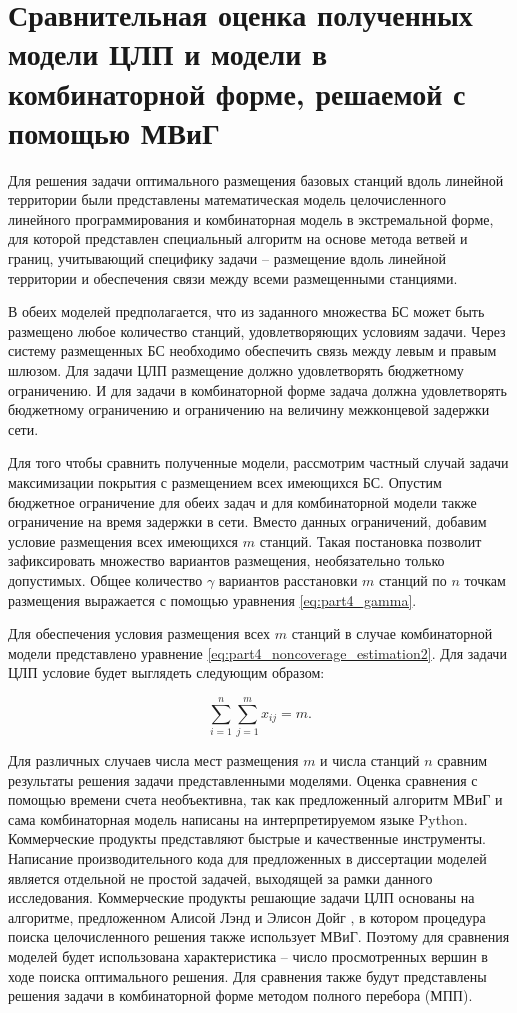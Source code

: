 \section{Сравнительная оценка полученных модели ЦЛП и модели в комбинаторной форме, решаемой с помощью МВиГ}
Для решения задачи оптимального размещения базовых станций вдоль линейной территории были представлены математическая модель целочисленного линейного программирования и комбинаторная модель в экстремальной форме, для которой представлен специальный алгоритм на основе метода ветвей и границ, учитывающий специфику задачи -- размещение вдоль линейной территории и обеспечения связи между всеми размещенными станциями.

В обеих моделей предполагается, что из заданного множества БС может быть размещено любое количество станций, удовлетворяющих условиям задачи. Через систему размещенных БС необходимо обеспечить связь между левым и правым шлюзом. Для задачи ЦЛП размещение должно удовлетворять бюджетному ограничению. И для задачи в комбинаторной форме задача должна удовлетворять бюджетному ограничению и ограничению на величину межконцевой задержки сети.

Для того чтобы сравнить полученные модели, рассмотрим частный случай задачи максимизации покрытия с размещением всех имеющихся БС. Опустим бюджетное ограничение для обеих задач и для комбинаторной модели также ограничение на время задержки в сети. Вместо данных ограничений, добавим условие размещения всех имеющихся $m$ станций. Такая постановка позволит зафиксировать множество вариантов размещения, необязательно только допустимых. Общее количество $\gamma$ вариантов расстановки $m$ станций по $n$ точкам размещения выражается с помощью уравнения \cref{eq:part4_gamma}.


Для обеспечения условия размещения всех $m$ станций в случае комбинаторной модели представлено уравнение \cref{eq:part4_noncoverage_estimation2}. Для задачи ЦЛП условие будет выглядеть следующим образом:


\begin{equation}
  \label{eq:part3_placed_all_station}
  \sum\limits_{i=1}^n \sum\limits_{j=1}^m x_{ij} = m.
\end{equation}

Для различных случаев числа мест размещения $m$ и числа станций $n$ сравним результаты решения задачи представленными моделями. Оценка сравнения с помощью времени счета необъективна, так как предложенный алгоритм МВиГ и сама комбинаторная модель написаны на интерпретируемом языке Python. Коммерческие продукты представляют быстрые и качественные инструменты. Написание производительного кода для предложенных в диссертации моделей является отдельной не простой задачей, выходящей за рамки данного исследования. Коммерческие продукты решающие задачи ЦЛП основаны на алгоритме, предложенном Алисой Лэнд и Элисон Дойг \cite{Land1960}, в котором процедура поиска целочисленного решения также использует МВиГ.  Поэтому для сравнения моделей будет использована характеристика -- число просмотренных вершин в ходе поиска оптимального решения. Для сравнения также будут представлены решения задачи в комбинаторной форме методом полного перебора (МПП).


